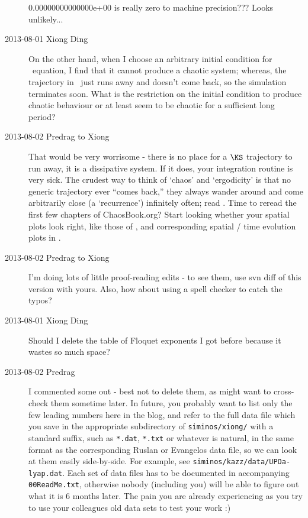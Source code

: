 \begin{description}
0.00000000000000e+00 is really zero to machine precision??? Looks unlikely...

\item[2013-08-01 Xiong Ding]
On the other hand, when I choose an arbitrary initial
condition for \KS\ equation, I find that it cannot produce a chaotic system; whereas, the
trajectory in \statesp\ just runs away and doesn't come back, so the simulation terminates
soon. What is the restriction on the initial condition to produce chaotic behaviour or at least
seem to be chaotic for a sufficient long period?

\item[2013-08-02 Predrag to Xiong]
That would be very worrisome - there is no place for a $\KS$ trajectory
to run away, it is a dissipative system. If it does, your integration
routine is very sick. The crudest way to think of
`chaos' and `ergodicity' is that no generic trajectory ever ``comes
back,'' they always wander around and come arbitrarily close (a
`recurrence') infinitely often; read .
 Time to reread the first few chapters of
ChaosBook.org? Start looking whether your spatial plots look right, like
those of , and corresponding spatial / time evolution
plots in .




\item[2013-08-02 Predrag to Xiong] I'm doing lots of little proof-reading
edits - to see them, use svn diff of this version with yours. Also, how
about using a spell checker to catch the typos?

\item[2013-08-01 Xiong Ding] Should I delete the table of Floquet
exponents I got before because it wastes so much space?

\item[2013-08-02 Predrag] I commented some out - best not to delete
them, as might want to cross-check them sometime later.
In future, you probably want to list only the
few leading numbers here in the blog, and refer to the full data file
which you save in the appropriate subdirectory of \texttt{siminos/xiong/}
with a standard suffix, such as \texttt{*.dat}, \texttt{*.txt} or
whatever is natural, in the same format as the corresponding Ruslan or
Evangelos data file, so we can look at them easily side-by-side. For
example, see \texttt{siminos/kazz/data/UPOa-lyap.dat}. Each set of data
files has to be documented in accompanying \texttt{00ReadMe.txt},
otherwise nobody (including you) will be able to figure out what it is 6
months later. The pain you are already experiencing as you try to use
your colleagues old data sets to test your work :)


\end{description}
